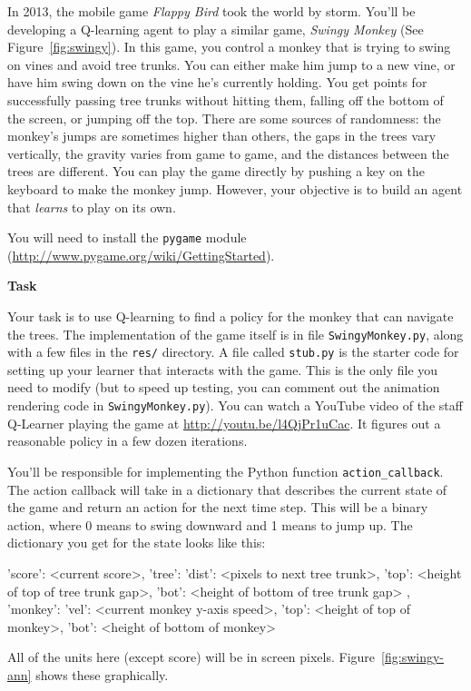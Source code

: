 \documentclass[submit]{harvardml}
\begin{document}
\newpage

\begin{problem}
  In 2013, the mobile game \emph{Flappy Bird} took the world by storm. You'll be developing a Q-learning agent to play a similar game, \emph{Swingy Monkey} (See Figure~\ref{fig:swingy}).  In this game, you control a monkey that is trying to swing on vines and avoid tree trunks.  You can either make him jump to a new vine, or have him swing down on the vine he's currently holding.  You get points for successfully passing tree trunks without hitting them, falling off the bottom of the screen, or jumping off the top.  There are some sources of randomness: the monkey's jumps are sometimes higher than others, the gaps in the trees vary vertically, the gravity varies from game to game, and the distances between the trees are different.  You can play the game directly by pushing a key on the keyboard to make the monkey jump.  However, your objective is to build an agent that \emph{learns} to play on its own. 
  
   You will need to install the \verb|pygame| module
  (\url{http://www.pygame.org/wiki/GettingStarted}).

\textbf{Task}

Your task is to use Q-learning to find a policy for the monkey that can navigate the trees.  The implementation of the game itself is in file \verb|SwingyMonkey.py|, along with a few files in the \verb|res/| directory.  A file called \verb|stub.py| is the starter code for setting up your learner that interacts with the game.  This is the only file you need to modify (but to speed up testing, you can comment out the animation rendering code in \verb|SwingyMonkey.py|). You can watch a YouTube video of the staff Q-Learner playing the game at \url{http://youtu.be/l4QjPr1uCac}.  It figures out a reasonable policy in a few dozen iterations.

You'll be responsible for implementing the Python function  \verb|action_callback|. The action callback will take in a dictionary that describes the current state of the game and return an action for the next time step.  This will be a binary action, where 0 means to swing downward and 1 means to jump up.  The dictionary you get for the state looks like this:
\begin{csv}
{ 'score': <current score>,
  'tree': { 'dist': <pixels to next tree trunk>,
            'top':  <height of top of tree trunk gap>,
            'bot':  <height of bottom of tree trunk gap> },
  'monkey': { 'vel': <current monkey y-axis speed>,
              'top': <height of top of monkey>,
              'bot': <height of bottom of monkey> }}
\end{csv}
All of the units here (except score) will be in screen pixels. Figure~\ref{fig:swingy-ann} shows these graphically. 


\end{problem}
\end{document}
